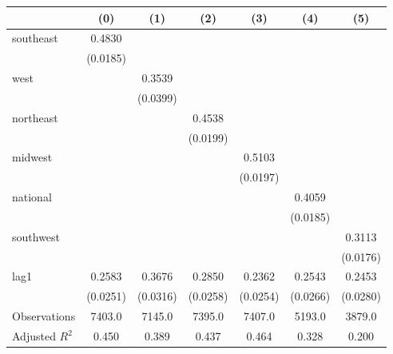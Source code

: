 \begin{tabular}{lcccccc}
\toprule
 & (0) & (1) & (2) & (3) & (4) & (5) \\
\midrule
southeast & 0.4830 &  &  &  &  &  \\
\vspace{0.2cm}
 & (0.0185) &  &  &  &  &  \\
west &  & 0.3539 &  &  &  &  \\
\vspace{0.2cm}
 &  & (0.0399) &  &  &  &  \\
northeast &  &  & 0.4538 &  &  &  \\
\vspace{0.2cm}
 &  &  & (0.0199) &  &  &  \\
midwest &  &  &  & 0.5103 &  &  \\
\vspace{0.2cm}
 &  &  &  & (0.0197) &  &  \\
national &  &  &  &  & 0.4059 &  \\
\vspace{0.2cm}
 &  &  &  &  & (0.0185) &  \\
southwest &  &  &  &  &  & 0.3113 \\
\vspace{0.2cm}
 &  &  &  &  &  & (0.0176) \\
lag1 & 0.2583 & 0.3676 & 0.2850 & 0.2362 & 0.2543 & 0.2453 \\
\vspace{0.2cm}
 & (0.0251) & (0.0316) & (0.0258) & (0.0254) & (0.0266) & (0.0280) \\
\midrule
Observations & 7403.0 & 7145.0 & 7395.0 & 7407.0 & 5193.0 & 3879.0 \\
Adjusted $R^2$ & 0.450 & 0.389 & 0.437 & 0.464 & 0.328 & 0.200 \\
\bottomrule
\end{tabular}